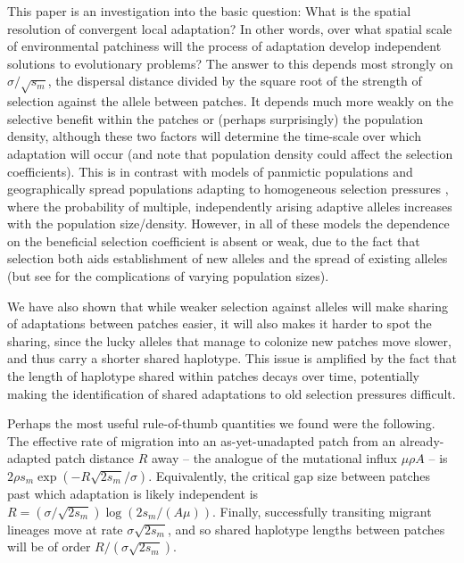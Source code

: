 \documentclass{article}
\newcommand{\linelabel}[1]{}
\newcommand{\citep}[1]{\cite{#1}}
\newcommand{\citet}[1]{\cite{#1}}
\begin{document}
This paper is an investigation into the basic question: 
What is the spatial resolution of convergent local adaptation?
In other words, 
over what spatial scale of environmental patchiness will the process
of adaptation develop independent solutions to evolutionary problems?
The answer to this depends most strongly on $\sigma/\sqrt{s_m}$, 
the dispersal distance divided by the square root of the strength of selection against the allele between patches. 
It depends much more weakly on the
selective benefit within the patches or (perhaps surprisingly) the population density, 
although these two factors will determine the time-scale over which adaptation will occur
(and note that population density could affect the selection coefficients). \linelabel{rr:popdensity}
This is in contrast with models of panmictic populations
\citep{softsweepsI, MesserPetrov, wilson2014selective} 
and geographically spread populations adapting to homogeneous selection pressures \citep{ralph2010parallel}, 
where the probability of multiple, independently arising adaptive alleles increases with the population size/density. 
However, in all of these models the dependence on the beneficial selection
coefficient is absent or weak, due to the fact that selection both
aids establishment of new alleles and the spread of existing
alleles (but see \citet{wilson2014selective} for the complications of varying population sizes). 

We have also shown that
while weaker selection against alleles will make sharing 
of adaptations between patches easier, 
it will also makes it harder to spot the sharing,
since the lucky alleles that manage to colonize new patches move slower,
and thus carry a shorter shared haplotype.
This issue is amplified by the fact that the length of haplotype
shared within patches decays over time, potentially making the
identification of shared adaptations to old selection pressures difficult.

Perhaps the most useful rule-of-thumb quantities we found were the following.
The effective rate of migration into an as-yet-unadapted patch from an already-adapted patch distance $R$ away 
-- the analogue of the mutational influx $\mu \rho A$ --
is $2 \rho s_m \exp(- R \sqrt{2 s_m} / \sigma)$.
Equivalently, the critical gap size between patches past which adaptation is likely independent
is $R = (\sigma/\sqrt{2s_m}) \log(2s_m/(A \mu))$.
Finally, successfully transiting migrant lineages move at rate $\sigma \sqrt{2s_m}$,
and so shared haplotype lengths between patches will be of order $R/(\sigma \sqrt{2s_m})$.
\end{document}
